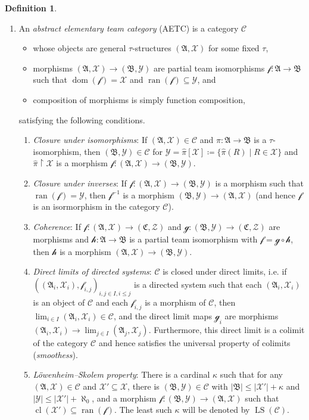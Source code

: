 \documentclass[a4paper]{amsart}
\theoremstyle{definition}
\newtheorem{definition}{Definition}[section]
\theoremstyle{remark}
\renewcommand{\restriction}{ {\upharpoonright} }
\newcommand{\Z}{\mathcal{Z}}
\newcommand{\A}{\mathcal{A}}
\newcommand{\B}{\mathcal{B}}
\newcommand{\C}{\mathcal{C}}
\DeclareMathOperator{\dom}{dom}
\DeclareMathOperator{\ran}{ran}
\newcommand{\Y}{\mathcal{Y}}
\newcommand{\X}{\mathcal{X}}
\DeclareMathOperator{\LS}{LS}
\theoremstyle{definition}
\renewcommand{\A}{\mathfrak{A}}
\renewcommand{\B}{\mathfrak{B}}
\renewcommand{\C}{\mathfrak{C}}
\newcommand{\f}{\mathcal{f}}
\newcommand{\g}{\mathcal{g}}
\newcommand{\h}{\mathcal{h}}
\DeclareMathOperator{\cl}{cl}
\begin{document}
\begin{definition}
\begin{enumerate}
        \item An \emph{abstract elementary team category} (AETC) is a category $\mathcal C$
        \begin{itemize}
            \item whose objects are general $\tau$-structures $(\A,\X)$ for some fixed $\tau$,
            \item morphisms $(\A,\X)\to(\B,\Y)$ are partial team isomorphisms $\f\colon\A\to\B$ such that $\dom(\f) = \X$ and $\ran(\f)\subseteq\Y$, and
            \item composition of morphisms is simply function composition,
        \end{itemize}
        satisfying the following conditions.
        \begin{enumerate}
            \item \emph{Closure under isomorphisms}: If $(\A,\X)\in\mathcal C$ and $\pi\colon\A\to\B$ is a $\tau$-isomorphism, then $(\B,\Y)\in\mathcal C$ for $\Y = \hat\pi[\X]\coloneqq \{\hat\pi(R) \mid R\in\X\}$ and $\hat\pi\restriction\X$ is a morphism $\f\colon(\A,\X)\to(\B,\Y)$.
            \item \emph{Closure under inverses}: If $\f\colon(\A,\X)\to(\B,\Y)$ is a morphism such that $\ran(\f) = \Y$, then $\f^{-1}$ is a morphism $(\B,\Y)\to(\A,\X)$ (and hence $\f$ is an isormorphism in the category $\mathcal C$).
            \item \emph{Coherence}: If $\f\colon(\A,\X)\to(\C,\Z)$ and $\g\colon(\B,\Y)\to(\C,\Z)$ are morphisms and $\h\colon\A\to\B$ is a partial team isomorphism with $\f = \g\circ\h$, then $\h$ is a morphism $(\A,\X)\to(\B,\Y)$.
            \item \emph{Direct limits of directed systems}: $\mathcal C$ is closed under direct limits, i.e. if $((\A_i,\X_i),\f_{i,j})_{i,j\in I,i\leq j}$ is a directed system such that each $(\A_i,\X_i)$ is an object of $\mathcal C$ and each $\f_{i,j}$ is a morphism of $\mathcal C$, then $\lim_{i\in I}(\A_i,\X_i)\in\mathcal C$, and the direct limit maps $\g_i$ are morphisms $(\A_i,\X_i)\to\lim_{j\in I}(\A_j,\X_j)$. Furthermore, this direct limit is a colimit of the category $\mathcal C$ and hence satisfies the universal property of colimits (\emph{smoothess}).
            \item \emph{Löwenheim--Skolem property}: There is a cardinal $\kappa$ such that for any $(\A,\X)\in\mathcal C$ and $\X'\subseteq\X$, there is $(\B,\Y)\in\mathcal C$ with $|\B|\leq|\X'|+\kappa$ and $|\Y|\leq|\X'|+\aleph_0$, and a morphism $\f\colon(\B,\Y)\to(\A,\X)$ such that $\cl(\X')\subseteq\ran(\f)$. The least such $\kappa$ will be denoted by $\LS(\mathcal C)$.
        \end{enumerate}
    \end{enumerate}
\end{definition}
\end{document}
